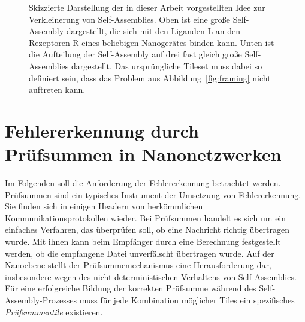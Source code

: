 \begin{figure}
    \caption[Skizzierter Ansatz zur Nachrichtenverkleinerung]{Skizzierte Darstellung der in dieser Arbeit vorgestellten Idee zur Verkleinerung von Self-Assemblies. Oben ist eine große Self-Assembly dargestellt, die sich mit den Liganden L an den Rezeptoren R eines beliebigen Nanogerätes binden kann. Unten ist die Aufteilung der Self-Assembly auf drei fast gleich große Self-Assemblies dargestellt. Das ursprüngliche Tileset muss dabei so definiert sein, dass das Problem aus Abbildung~\ref{fig:framing} nicht auftreten kann.}
    \label{fig:framing_idee}
\end{figure}

\section{Fehlererkennung durch Prüfsummen in Nanonetzwerken}

Im Folgenden soll die Anforderung der Fehlererkennung betrachtet werden. Prüfsummen sind ein typisches Instrument der Umsetzung von Fehlererkennung. 
Sie finden sich in einigen Headern von herkömmlichen Kommunikationsprotokollen wieder. 
Bei Prüfsummen handelt es sich um ein einfaches Verfahren, das überprüfen soll, ob eine Nachricht richtig übertragen wurde. 
Mit ihnen kann beim Empfänger durch eine Berechnung festgestellt werden, ob die empfangene Datei unverfälscht übertragen wurde. 
Auf der Nanoebene stellt der Prüfsummemechanismus eine Herausforderung dar, insbesondere wegen des nicht-deterministischen Verhaltens von Self-Assemblies.
Für eine erfolgreiche Bildung der korrekten Prüfsumme während des Self-Assembly-Prozesses muss für jede Kombination möglicher Tiles ein spezifisches \emph{Prüfsummentile} existieren.

